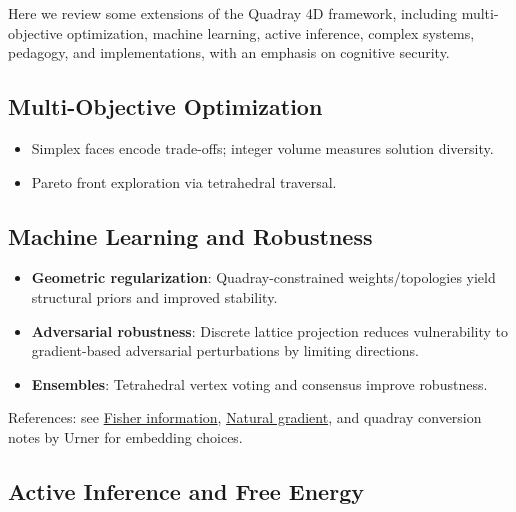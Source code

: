 \documentclass[
  10pt,
]{article}
\providecommand{\tightlist}{%
  \setlength{\itemsep}{0pt}\setlength{\parskip}{0pt}}
\begin{document}
Here we review some extensions of the Quadray 4D framework, including
multi-objective optimization, machine learning, active inference,
complex systems, pedagogy, and implementations, with an emphasis on
cognitive security.

\hypertarget{multi-objective-optimization}{%
\subsection{Multi-Objective
Optimization}\label{multi-objective-optimization}}

\begin{itemize}
\tightlist
\item
  Simplex faces encode trade-offs; integer volume measures solution
  diversity.
\item
  Pareto front exploration via tetrahedral traversal.
\end{itemize}

\hypertarget{machine-learning-and-robustness}{%
\subsection{Machine Learning and
Robustness}\label{machine-learning-and-robustness}}

\begin{itemize}
\tightlist
\item
  \textbf{Geometric regularization}: Quadray-constrained
  weights/topologies yield structural priors and improved stability.
\item
  \textbf{Adversarial robustness}: Discrete lattice projection reduces
  vulnerability to gradient-based adversarial perturbations by limiting
  directions.
\item
  \textbf{Ensembles}: Tetrahedral vertex voting and consensus improve
  robustness.
\end{itemize}

References: see
\href{https://en.wikipedia.org/wiki/Fisher_information}{Fisher
information},
\href{https://en.wikipedia.org/wiki/Natural_gradient}{Natural gradient},
and quadray conversion notes by Urner for embedding choices.

\hypertarget{active-inference-and-free-energy}{%
\subsection{Active Inference and Free
Energy}\label{active-inference-and-free-energy}}
\end{document}
